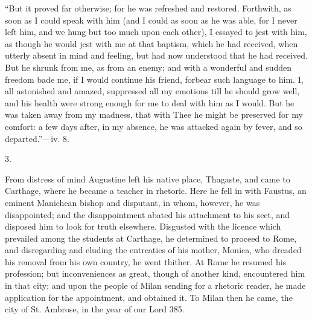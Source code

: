 ``But it proved far otherwise; for he was refreshed and
restored. Forthwith, as soon as I could
speak with him (and I could as soon as he was able, for I never left
him, and we hung but too much upon each other), I essayed to jest with
him, as though he would jest with me at that baptism, which he had
received, when utterly absent in mind and feeling, but had now
understood that he had received. But he shrunk from me, as from an
enemy; and with a wonderful and sudden freedom bade me, if I would
continue his friend, forbear such language to him. I, all astonished
and amazed, suppressed all my emotions till he should grow well, and
his health were strong enough for me to deal with him as I would. But
he was taken away from my madness, that with Thee he might be
preserved for my comfort: a few days after, in my absence, he was
attacked again by fever, and so departed.''—iv. 8.

3.

From distress of mind Augustine left his native place, Thagaste,
and came to Carthage, where he became a teacher in rhetoric. Here he
fell in with Faustus, an eminent Manichean bishop and disputant, in
whom, however, he was disappointed; and the disappointment abated his
attachment to his sect, and disposed him to look for truth elsewhere.
Disgusted with the licence which prevailed among the students at
Carthage, he determined to proceed to Rome, and disregarding and
eluding the entreaties of his mother, Monica, who dreaded his removal
from his own country, he went thither. At Rome he resumed his
profession; but inconveniences as great, though of another kind,
encountered him in that city; and upon the people of Milan sending for
a rhetoric reader, he made application for the appointment, and
obtained it. To Milan then he came, the city of St. Ambrose, in the
year of our Lord 385.

